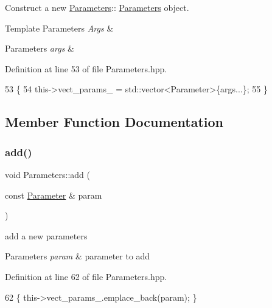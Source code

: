 Construct a new \hyperlink{classParameters}{Parameters}\+:\+: \hyperlink{classParameters}{Parameters} object. 


\begin{DoxyTemplParams}{Template Parameters}
{\em Args} & \\
\hline
\end{DoxyTemplParams}

\begin{DoxyParams}{Parameters}
{\em args} & \\
\hline
\end{DoxyParams}


Definition at line 53 of file Parameters.\+hpp.


\begin{DoxyCode}
53                                           \{
54   this->vect\_params\_ = std::vector<Parameter>\{args...\};
55 \}
\end{DoxyCode}


\subsection{Member Function Documentation}
\mbox{\label{classParameters_a0e846d18b12895afa22311f4b597ff90}} 
\subsubsection{\texorpdfstring{add()}{add()}}
{\footnotesize\ttfamily void Parameters\+::add (\begin{DoxyParamCaption}\item[{const \hyperlink{classParameter}{Parameter} \&}]{param }\end{DoxyParamCaption})}



add a new parameters 


\begin{DoxyParams}{Parameters}
{\em param} & parameter to add \\
\hline
\end{DoxyParams}


Definition at line 62 of file Parameters.\+hpp.


\begin{DoxyCode}
62 \{ this->vect\_params\_.emplace\_back(param); \}
\end{DoxyCode}
\mbox{\label{classParameters_a33402b196d17c9f3816f9c889b87c540}} 
